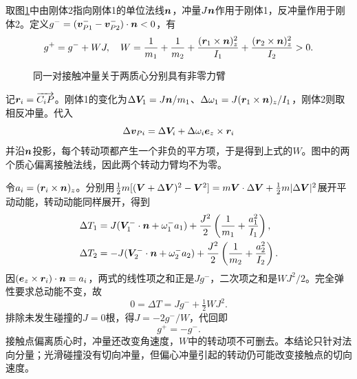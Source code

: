 \begin{solution}
取图\ref{fig:hw5-1-s}中由刚体2指向刚体1的单位法线$\bm{n}$，冲量$J\bm{n}$作用于刚体1，反冲量作用于刚体2。定义$g^-=(\bm{v}_{P1}^--\bm{v}_{P2}^-)\cdot\bm{n}<0$，有
\[
 g^+=g^-+WJ,\quad W=\frac1{m_1}+\frac1{m_2}
 +\frac{(\bm{r}_1\times\bm{n})_z^2}{I_1}
 +\frac{(\bm{r}_2\times\bm{n})_z^2}{I_2}>0.
\]

\begin{figure}[H]\centering
{}
\caption{同一对接触冲量关于两质心分别具有非零力臂}\label{fig:hw5-1-s}
\end{figure}

记$\bm{r}_i=\overrightarrow{C_iP}$。刚体1的变化为$\Delta\bm{V}_1=J\bm{n}/m_1$、$\Delta\omega_1=J(\bm{r}_1\times\bm{n})_z/I_1$，刚体2则取相反冲量。代入
\[
 \Delta\bm{v}_{Pi}=\Delta\bm{V}_i+
 \Delta\omega_i\bm{e}_z\times\bm{r}_i
\]
并沿$\bm{n}$投影，每个转动项都产生一个非负的平方项，于是得到上式的$W$。图中的两个质心偏离接触法线，因此两个转动力臂均不为零。

令$a_i=(\bm{r}_i\times\bm{n})_z$。分别用$\tfrac12m[(\bm{V}+\Delta\bm{V})^2-\bm{V}^2]=m\bm{V}\cdot\Delta\bm{V}+\tfrac12m|\Delta\bm{V}|^2$展开平动动能，转动动能同样展开，得到
\[
\begin{aligned}
\Delta T_1&=J(\bm{V}_1^-\cdot\bm{n}+\omega_1^-a_1)
+\frac{J^2}{2}\left(\frac1{m_1}+\frac{a_1^2}{I_1}\right),\\
\Delta T_2&=-J(\bm{V}_2^-\cdot\bm{n}+\omega_2^-a_2)
+\frac{J^2}{2}\left(\frac1{m_2}+\frac{a_2^2}{I_2}\right).
\end{aligned}
\]
因$(\bm{e}_z\times\bm{r}_i)\cdot\bm{n}=a_i$，两式的线性项之和正是$Jg^-$，二次项之和是$WJ^2/2$。完全弹性要求总动能不变，故
\[
 0=\Delta T=Jg^-+\tfrac12WJ^2.
\]
排除未发生碰撞的$J=0$根，得$J=-2g^-/W$，代回即
\[
 \boxed{g^+=-g^-}.
\]
接触点偏离质心时，冲量还改变角速度，$W$中的转动项不可删去。本结论只针对法向分量；光滑碰撞没有切向冲量，但偏心冲量引起的转动仍可能改变接触点的切向速度。


\end{solution}



